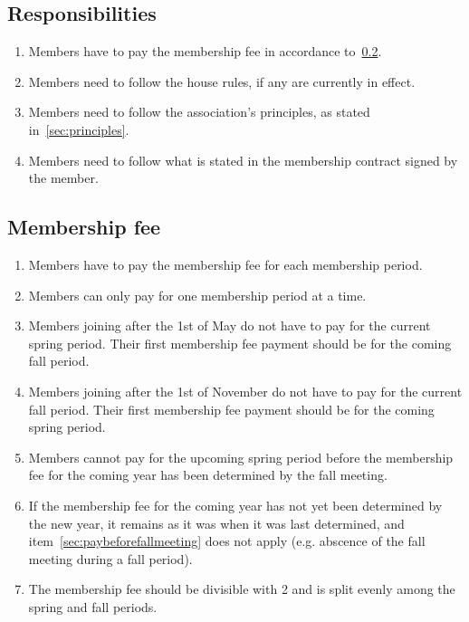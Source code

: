 \subsection{Responsibilities}
\begin{enumerate}
  \item Members have to pay the membership fee in accordance to~\ref{sec:membershipFee}.
  \item Members need to follow the house rules, if any are currently in effect.
  \item Members need to follow the association's principles, as stated in~\ref{sec:principles}.
  \item Members need to follow what is stated in the membership contract signed by the member.
\end{enumerate}

\subsection{Membership fee} \label{sec:membershipFee}
\begin{enumerate}
  \item Members have to pay the membership fee for each membership period.
  \item Members can only pay for one membership period at a time.
  \item Members joining after the 1st of May do not have to pay for the current spring period. Their first membership fee payment should be for the coming fall period.
  \item Members joining after the 1st of November do not have to pay for the current fall period. Their first membership fee payment should be for the coming spring period.
  \item Members cannot pay for the upcoming spring period before the membership fee for the coming year has been determined by the fall meeting. \label{sec:paybeforefallmeeting}
  \item If the membership fee for the coming year has not yet been determined by the new year, it remains as it was when it was last determined, and item~\ref{sec:paybeforefallmeeting} does not apply (e.g. abscence of the fall meeting during a fall period).
  \item The membership fee should be divisible with 2 and is split evenly among the spring and fall periods.
\end{enumerate}


